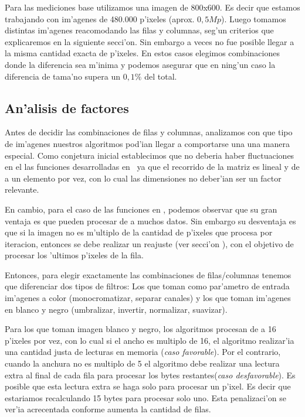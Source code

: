 Para las mediciones base utilizamos una imagen de 800x600. Es decir que estamos trabajando con im'agenes de 480.000 p'ixeles (aprox. $0,5Mp$). Luego tomamos distintas im'agenes reacomodando las filas y columnas, seg'un criterios que explicaremos en la siguiente secci'on. Sin embargo a veces no fue posible llegar a la misma cantidad exacta de p'ixeles. En estos casos elegimos combinaciones donde la diferencia sea m'inima y podemos asegurar que en ning'un caso la diferencia de tama'no supera un $0,1\%$ del total.

\subsection{An'alisis de factores}
Antes de decidir las combinaciones de filas y columnas, analizamos con que tipo de im'agenes nuestros algoritmos pod'ian
llegar a comportarse una una manera especial. Como conjetura inicial establecimos que no deberia haber 
fluctuaciones en el las funciones desarrolladas en \C \ ya que el recorrido de la matriz es lineal y
de a un elemento por vez, con lo cual las dimensiones no deber'ian ser un factor relevante. 

En cambio, para el caso de las funciones en \ass, podemos observar que su gran ventaja es que pueden procesar de a muchos datos. Sin embargo su desventaja es que si la imagen no es m'ultiplo de la cantidad de p'ixeles que procesa por iteracion, entonces se debe realizar un reajuste (ver secci'on \label{sec:algoritmos}), con el objetivo de procesar los 'ultimos p'ixeles de la fila.

Entonces, para elegir exactamente las combinaciones de filas/columnas tenemos que diferenciar dos tipos de
filtros: Los que toman como par'ametro de entrada im'agenes a color (monocromatizar, separar canales) y los que toman im'agenes en blanco y negro
(umbralizar, invertir, normalizar, suavizar).

Para los que toman imagen blanco y negro, los algoritmos procesan de a 16 p'ixeles por vez, con lo cual si el ancho es multiplo de 16, el algoritmo realizar'ia una cantidad justa de lecturas en memoria (\textit{caso favorable}). Por el contrario, cuando la anchura no es multiplo de 5 el algoritmo debe realizar una lectura extra al final de cada fila para procesar los bytes restantes(\textit{caso desfavorable}). Es posible que esta lectura extra se haga solo para procesar un p'ixel. Es decir que estariamos recalculando 15 bytes para procesar solo uno. Esta penalizaci'on se ver'ia acrecentada conforme aumenta la cantidad de filas.

